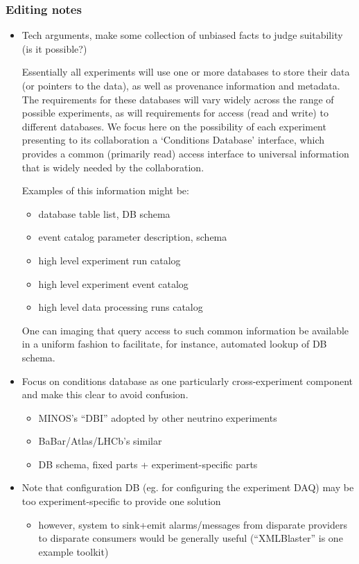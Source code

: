 \subsubsection{Editing notes}




\begin{itemize}
\item Tech arguments, make some collection of unbiased facts to judge suitability (is it possible?)

	Essentially all experiments will use one or more databases to
	store their data (or pointers to the data), as well as provenance 
	information and metadata.  The requirements for these databases will
	vary widely across the range of possible experiments, as will
	requirements for access (read and write) to different databases.  
	We focus here on the possibility of each experiment presenting
	to its collaboration a `Conditions Database' interface, which
	provides a common (primarily read) access interface to universal
	information that is widely needed by the collaboration.

	Examples of this information might be:
	\begin{itemize}
	\item database table list, DB schema
	\item event catalog parameter description, schema
	\item high level experiment run catalog
	\item high level experiment event catalog
	\item high level data processing runs catalog
	\end{itemize}

	One can imaging that query access to such common information be
	available in a uniform fashion to facilitate, for instance,
	automated lookup of DB schema.  

\item Focus on conditions database as one particularly cross-experiment component and make this clear to avoid confusion.
  \begin{itemize}
  \item MINOS's ``DBI'' adopted by other neutrino experiments
  \item BaBar/Atlas/LHCb's similar
  \item DB schema, fixed parts + experiment-specific parts
  \end{itemize}
\item Note that configuration DB (eg. for configuring the experiment DAQ) may be too experiment-specific to provide one solution
  \begin{itemize}
  \item however, system to sink+emit alarms/messages from disparate providers to disparate consumers would be generally useful (``XMLBlaster'' is one example toolkit)
  \end{itemize}
\end{itemize}
